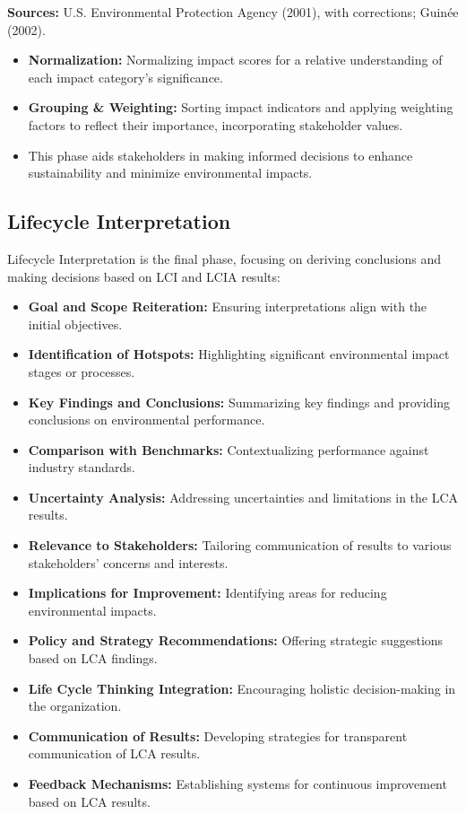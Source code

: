 \documentclass{article}
\begin{document}
\textbf{Sources:} U.S. Environmental Protection Agency (2001), with corrections; Guinée (2002).

\begin{itemize}
    \item \textbf{Normalization:} Normalizing impact scores for a relative understanding of each impact category's significance.
    \item \textbf{Grouping \& Weighting:} Sorting impact indicators and applying weighting factors to reflect their importance, incorporating stakeholder values.
    \item This phase aids stakeholders in making informed decisions to enhance sustainability and minimize environmental impacts.
\end{itemize}

\subsection*{Lifecycle Interpretation}
Lifecycle Interpretation is the final phase, focusing on deriving conclusions and making decisions based on LCI and LCIA results:

\begin{itemize}
    \item \textbf{Goal and Scope Reiteration:} Ensuring interpretations align with the initial objectives.
    \item \textbf{Identification of Hotspots:} Highlighting significant environmental impact stages or processes.
    \item \textbf{Key Findings and Conclusions:} Summarizing key findings and providing conclusions on environmental performance.
    \item \textbf{Comparison with Benchmarks:} Contextualizing performance against industry standards.
    \item \textbf{Uncertainty Analysis:} Addressing uncertainties and limitations in the LCA results.
    \item \textbf{Relevance to Stakeholders:} Tailoring communication of results to various stakeholders' concerns and interests.
    \item \textbf{Implications for Improvement:} Identifying areas for reducing environmental impacts.
    \item \textbf{Policy and Strategy Recommendations:} Offering strategic suggestions based on LCA findings.
    \item \textbf{Life Cycle Thinking Integration:} Encouraging holistic decision-making in the organization.
    \item \textbf{Communication of Results:} Developing strategies for transparent communication of LCA results.
    \item \textbf{Feedback Mechanisms:} Establishing systems for continuous improvement based on LCA results.
\end{itemize}
\end{document}
